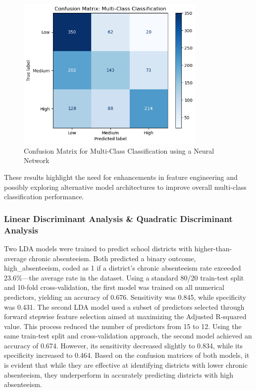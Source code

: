 \documentclass[
  11pt,
]{article}
\begin{document}
\begin{figure}[H]

{\centering \includegraphics[width=3.6in,height=\textheight]{../images/nn-multi-confusion-matrix.png}

}

\caption{Confusion Matrix for Multi-Class Classification using a Neural
Network}

\end{figure}%

These results highlight the need for enhancements in feature engineering
and possibly exploring alternative model architectures to improve
overall multi-class classification performance.

\subsubsection{Linear Discriminant Analysis \& Quadratic Discriminant
Analysis}\label{linear-discriminant-analysis-quadratic-discriminant-analysis-1}

Two LDA models were trained to predict school districts with
higher-than-average chronic absenteeism. Both predicted a binary
outcome, high\_absenteeism, coded as 1 if a district's chronic
absenteeism rate exceeded 23.6\%---the average rate in the dataset.
Using a standard 80/20 train-test split and 10-fold cross-validation,
the first model was trained on all numerical predictors, yielding an
accuracy of 0.676. Sensitivity was 0.845, while specificity was 0.431.
The second LDA model used a subset of predictors selected through
forward stepwise feature selection aimed at maximizing the Adjusted
R-squared value. This process reduced the number of predictors from 15
to 12. Using the same train-test split and cross-validation approach,
the second model achieved an accuracy of 0.674. However, its sensitivity
decreased slightly to 0.834, while its specificity increased to 0.464.
Based on the confusion matrices of both models, it is evident that while
they are effective at identifying districts with lower chronic
absenteeism, they underperform in accurately predicting districts with
high absenteeism.
\end{document}
